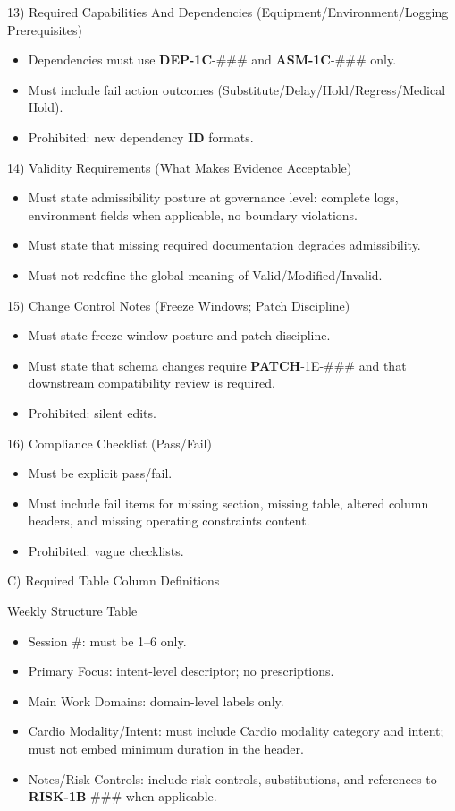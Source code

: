 \documentclass[10pt]{article}
\begin{document}
13) Required Capabilities And Dependencies (Equipment/Environment/Logging Prerequisites)

\begin{itemize}
\item Dependencies must use \textbf{DEP-1C}-\#\#\# and \textbf{ASM-1C}-\#\#\# only.
\item Must include fail action outcomes (Substitute/Delay/Hold/Regress/Medical Hold).
\item Prohibited: new dependency \textbf{ID} formats.
\end{itemize}

14) Validity Requirements (What Makes Evidence Acceptable)

\begin{itemize}
\item Must state admissibility posture at governance level: complete logs, environment fields when applicable, no boundary violations.
\item Must state that missing required documentation degrades admissibility.
\item Must not redefine the global meaning of Valid/Modified/Invalid.
\end{itemize}

15) Change Control Notes (Freeze Windows; Patch Discipline)

\begin{itemize}
\item Must state freeze-window posture and patch discipline.
\item Must state that schema changes require \textbf{PATCH}-1E-\#\#\# and that downstream compatibility review is required.
\item Prohibited: silent edits.
\end{itemize}

16) Compliance Checklist (Pass/Fail)

\begin{itemize}
\item Must be explicit pass/fail.
\item Must include fail items for missing section, missing table, altered column headers, and missing operating constraints content.
\item Prohibited: vague checklists.
\end{itemize}

C) Required Table Column Definitions

Weekly Structure Table

\begin{itemize}
\item Session \#: must be 1–6 only.
\item Primary Focus: intent-level descriptor; no prescriptions.
\item Main Work Domains: domain-level labels only.
\item Cardio Modality/Intent: must include Cardio modality category and intent; must not embed minimum duration in the header.
\item Notes/Risk Controls: include risk controls, substitutions, and references to \textbf{RISK-1B}-\#\#\# when applicable.
\end{itemize}
\end{document}
